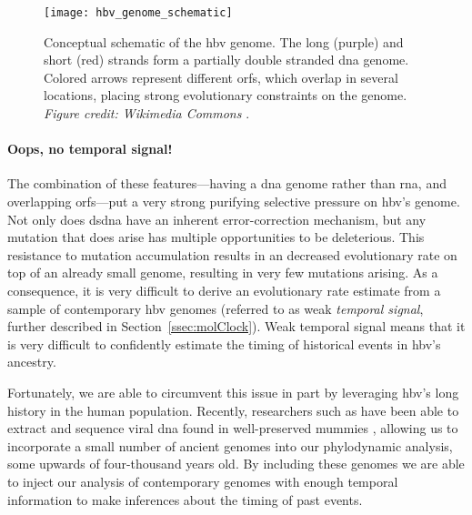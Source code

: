 \begin{figure}[ht]
  \centering
  \texttt{[image: hbv\_genome\_schematic]}
  \caption[Schematic of the hepatitis B virus genome]{Conceptual schematic of the \gls{hbv} genome. The long (purple) and short (red) strands form a partially double stranded \gls{dna} genome. Colored arrows represent different \gls{orf}s, which overlap in several locations, placing strong evolutionary constraints on the genome. \textit{Figure credit: Wikimedia Commons} \citep{commons2016file}.
  }
  \label{fig:hbvGenome}
\end{figure}

\paragraph*{Oops, no temporal signal!}
The combination of these features---having a \gls{dna} genome rather than \gls{rna}, and overlapping \gls{orf}s---put a very strong purifying selective pressure on \gls{hbv}'s genome.
Not only does ds\gls{dna} have an inherent error-correction mechanism, but any mutation that does arise has multiple opportunities to be deleterious.
This resistance to mutation accumulation results in an decreased evolutionary rate on top of an already small genome, resulting in very few mutations arising.
As a consequence, it is very difficult to derive an evolutionary rate estimate from a sample of contemporary \gls{hbv} genomes (referred to as weak \textit{temporal signal}, further described in Section~\ref{ssec:molClock}).
Weak temporal signal means that it is very difficult to confidently estimate the timing of historical events in \gls{hbv}'s ancestry.

Fortunately, we are able to circumvent this issue in part by leveraging \gls{hbv}'s long history in the human population.
Recently, researchers such as \citet{muhlemann2018ancient} have been able to extract and sequence viral \gls{dna} found in well-preserved mummies \citep{muhlemann2018ancient,ross2018paradox}, allowing us to incorporate a small number of ancient genomes into our phylodynamic analysis, some upwards of four-thousand years old.
By including these genomes we are able to inject our analysis of contemporary genomes with enough temporal information to make inferences about the timing of past events.

